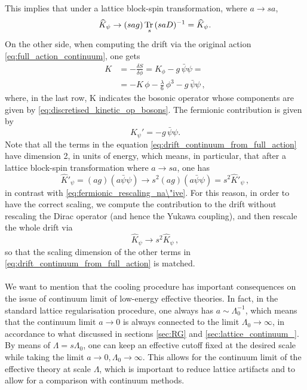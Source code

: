 This implies that under a lattice block-spin transformation, where $a \to sa$,
\begin{equation}
    \widehat{K}_{\psi} \to  (sag) \, \underset{s}{\operatorname{\text{Tr} \,}}{(saD)^{-1}} = \widehat{K}_{\psi}.
    \label{eq:fermionic_rescaling_na\"ive}
\end{equation}
On the other side, when computing the drift via the original action \eqref{eq:full_action_continuum}, one gets
\begin{equation}
    \begin{aligned}
        K &= - \frac{\delta S}{\delta \phi} = K_\phi - g \, \bar\psi\psi = \\
        &= - K \, \phi - \frac{\lambda}{6} \, \phi^3 - g \, \bar\psi\psi \, ,
    \end{aligned}
    \label{eq:drift_continuum_from_full_action}
\end{equation}
where, in the last row, K indicates the bosonic operator whose components are given by \eqref{eq:discretised_kinetic_op_bosons}. The fermionic contribution is given by
\begin{equation*}
    K_{\psi}' = - g \, \bar\psi\psi.
\end{equation*}
Note that all the terms in the equation \eqref{eq:drift_continuum_from_full_action} have dimension 2, in units of energy, which means, in particular, that after a lattice block-spin transformation where $a \to sa$, one has
\begin{equation}
    \widehat{K}'_\psi = (ag) (a\bar\psi \psi) \to s^2 (ag) (a\bar\psi \psi) = s^2 \widehat{K}'_\psi \, ,
    \label{eq:rescaling_blinear}
\end{equation}
in contrast with \eqref{eq:fermionic_rescaling_na\"ive}. For this reason, in order to have the correct scaling, we compute the contribution to the drift without rescaling the Dirac operator (and hence the Yukawa coupling), and then rescale the whole drift via 
\begin{equation*}
    \widehat{K}_\psi \to s^2 \widehat{K}_\psi \, ,
\end{equation*}
so that the scaling dimension of the other terms in \eqref{eq:drift_continuum_from_full_action} is matched. \\~\\
We want to mention that the cooling procedure has important consequences on the issue of continuum limit of low-energy effective theories. In fact, in the standard lattice regularisation procedure, one always has $a \sim \Lambda_0^{-1}$, which means that the continuum limit $a \to 0$ is always connected to the limit $\Lambda_0 \to \infty$, in accordance to what discussed in sections \ref{sec:RG} and \ref{sec:lattice_continuum_}. 
By means of  $\Lambda = s \Lambda_0$, one can keep an effective cutoff fixed at the desired scale while taking the limit $a \to 0, \Lambda_0 \to \infty$. This allows for the continuum limit of the effective theory at scale $\Lambda$, which is important to reduce lattice artifacts and to allow for a comparison with continuum methods.

